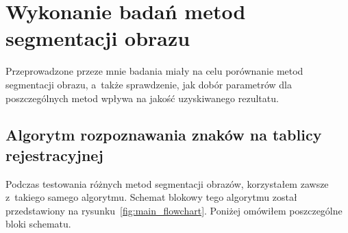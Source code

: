\section{Wykonanie badań metod segmentacji obrazu}
Przeprowadzone przeze mnie badania miały na celu porównanie metod segmentacji obrazu, a~także sprawdzenie, jak dobór parametrów dla poszczególnych metod wpływa na jakość uzyskiwanego rezultatu.

\subsection{Algorytm rozpoznawania znaków na tablicy rejestracyjnej}
Podczas testowania różnych metod segmentacji obrazów, korzystałem zawsze z~takiego samego algorytmu. Schemat blokowy tego algorytmu został przedstawiony na rysunku~\ref{fig:main_flowchart}. Poniżej omówiłem poszczególne bloki schematu.

